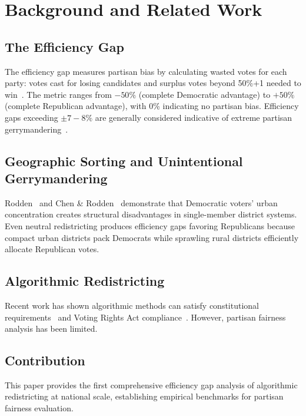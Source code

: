 \section{Background and Related Work}

\subsection{The Efficiency Gap}

The efficiency gap measures partisan bias by calculating wasted votes for each party: votes cast for losing candidates and surplus votes beyond 50\%+1 needed to win~\cite{stephanopoulos2015partisan}. The metric ranges from $-50\%$ (complete Democratic advantage) to $+50\%$ (complete Republican advantage), with 0\% indicating no partisan bias. Efficiency gaps exceeding $\pm 7-8\%$ are generally considered indicative of extreme partisan gerrymandering~\cite{mcghee2020fairness}.

\subsection{Geographic Sorting and Unintentional Gerrymandering}

Rodden~\cite{rodden2019cities} and Chen \& Rodden~\cite{chen2013unintentional} demonstrate that Democratic voters' urban concentration creates structural disadvantages in single-member district systems. Even neutral redistricting produces efficiency gaps favoring Republicans because compact urban districts pack Democrats while sprawling rural districts efficiently allocate Republican votes.

\subsection{Algorithmic Redistricting}

Recent work has shown algorithmic methods can satisfy constitutional requirements~\cite{deluca2026recursive,cho2016measuring} and Voting Rights Act compliance~\cite{deluca2026vra}. However, partisan fairness analysis has been limited.

\subsection{Contribution}

This paper provides the first comprehensive efficiency gap analysis of algorithmic redistricting at national scale, establishing empirical benchmarks for partisan fairness evaluation.
